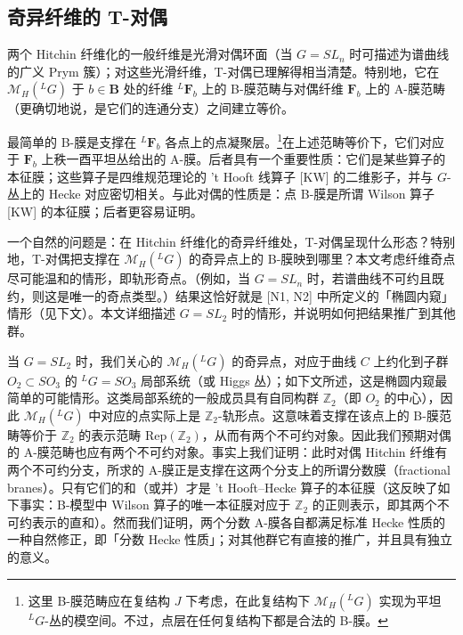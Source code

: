 
\subsection{奇异纤维的 T-对偶}

两个 Hitchin 纤维化的一般纤维是光滑对偶环面（当 $G=SL_n$ 时可描述为谱曲线的广义 Prym 簇）；对这些光滑纤维，T-对偶已理解得相当清楚。特别地，它在 $\mathcal{M}_H({}^{L}G)$ 于 $b\in\boldsymbol{B}$ 处的纤维 ${}^{L}\boldsymbol{F}_b$ 上的 B-膜范畴与对偶纤维 $\boldsymbol{F}_b$ 上的 A-膜范畴（更确切地说，是它们的连通分支）之间建立等价。

最简单的 B-膜是支撑在 ${}^{L}\boldsymbol{F}_b$ 各点上的点凝聚层。\footnote{这里 B-膜范畴应在复结构 $J$ 下考虑，在此复结构下 $\mathcal{M}_H({}^{L}G)$ 实现为平坦 ${}^{L}G$-丛的模空间。不过，点层在任何复结构下都是合法的 B-膜。}在上述范畴等价下，它们对应于 $\boldsymbol{F}_b$ 上秩一酉平坦丛给出的 A-膜。后者具有一个重要性质：它们是某些算子的本征膜；这些算子是四维规范理论的 't Hooft 线算子 [KW] 的二维影子，并与 $G$-丛上的 Hecke 对应密切相关。与此对偶的性质是：点 B-膜是所谓 Wilson 算子 [KW] 的本征膜；后者更容易证明。

一个自然的问题是：在 Hitchin 纤维化的奇异纤维处，T-对偶呈现什么形态？特别地，T-对偶把支撑在 $\mathcal{M}_H({}^{L}G)$ 的奇异点上的 B-膜映到哪里？本文考虑纤维奇点尽可能温和的情形，即轨形奇点。（例如，当 $G=SL_n$ 时，若谱曲线不可约且既约，则这是唯一的奇点类型。）结果这恰好就是 [N1, N2] 中所定义的「椭圆内窥」情形（见下文）。本文详细描述 $G=SL_2$ 时的情形，并说明如何把结果推广到其他群。

当 $G=SL_2$ 时，我们关心的 $\mathcal{M}_H({}^{L}G)$ 的奇异点，对应于曲线 $C$ 上约化到子群 $O_2\subset SO_3$ 的 ${}^{L}G=SO_3$ 局部系统（或 Higgs 丛）；如下文所述，这是椭圆内窥最简单的可能情形。这类局部系统的一般成员具有自同构群 $\mathbb{Z}_2$（即 $O_2$ 的中心），因此 $\mathcal{M}_H({}^{L}G)$ 中对应的点实际上是 $\mathbb{Z}_2$-轨形点。这意味着支撑在该点上的 B-膜范畴等价于 $\mathbb{Z}_2$ 的表示范畴 $\mathrm{Rep}(\mathbb{Z}_2)$，从而有两个不可约对象。因此我们预期对偶的 A-膜范畴也应有两个不可约对象。事实上我们证明：此时对偶 Hitchin 纤维有两个不可约分支，所求的 A-膜正是支撑在这两个分支上的所谓分数膜（fractional branes）。只有它们的和（或并）才是 't Hooft--Hecke 算子的本征膜（这反映了如下事实：B-模型中 Wilson 算子的唯一本征膜对应于 $\mathbb{Z}_2$ 的正则表示，即其两个不可约表示的直和）。然而我们证明，两个分数 A-膜各自都满足标准 Hecke 性质的一种自然修正，即「分数 Hecke 性质」；对其他群它有直接的推广，并且具有独立的意义。

